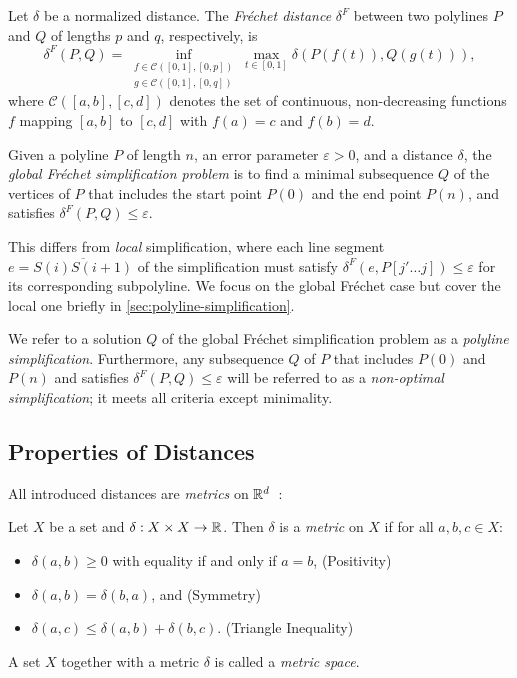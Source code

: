 \begin{definition}\label{def:frechet}
  Let \(\delta\) be a normalized distance. The \emph{Fréchet distance} \(\delta^F\) between two polylines \(P\) and \(Q\) of lengths \(p\) and \(q\), respectively, is
	\[\delta^F(P, Q) = \inf_{\substack{f \in \mathcal{C}([0,1], [0, p]) \\ g \in \mathcal{C}([0,1], [0, q])}} \max_{t \in [0,1]}\delta(P(f(t)), Q(g(t))),\]
	where \(\mathcal{C}([a,b], [c,d])\) denotes the set of continuous, non-decreasing functions \(f\) mapping \([a,b]\) to \([c,d]\) with \(f(a) = c\) and \(f(b) = d\).
\end{definition}

\begin{definition}
	Given a polyline \(P\) of length \(n\), an error parameter \(\varepsilon > 0\), and a distance \(\delta\), the \emph{global Fréchet simplification problem} is to find a minimal subsequence \(Q\) of the vertices of \(P\) that includes the start point \(P(0)\) and the end point \(P(n)\), and satisfies \(\delta^F(P, Q) \leq \varepsilon\).
\end{definition}

This differs from \emph{local} simplification, where each line segment \(e = \overline{S(i)S(i+1)}\) of the simplification must satisfy \(\delta^F(e, P[j' \dots j]) \leq \varepsilon\) for its corresponding subpolyline. We focus on the global Fréchet case but cover the local one briefly in \cref{sec:polyline-simplification}.

We refer to a solution \(Q\) of the global Fréchet simplification problem as a \emph{polyline simplification}. Furthermore, any subsequence \(Q\) of \(P\) that includes \(P(0)\) and \(P(n)\) and satisfies \(\delta^F(P, Q) \leq \varepsilon\) will be referred to as a \emph{non-optimal simplification}; it meets all criteria except minimality.

\subsection{Properties of Distances}
All introduced distances are \emph{metrics} on \(\mathbb{R}^d\)~\cite{metric_spaces}:

\begin{definition}\label{def:metric}
  Let \(X\) be a set and \(\delta:X\times X \to \mathbb{R}\). Then \(\delta\) is a \emph{metric} on \(X\) if for all \(a, b, c \in X\):
  \begin{itemize}
    \item \(\delta(a, b) \geq 0\) with equality if and only if \(a = b\), \hfill (Positivity)
    \item \(\delta(a, b) = \delta(b, a)\), and \hfill (Symmetry)
    \item \(\delta(a, c) \leq \delta(a, b) + \delta(b, c)\). \hfill (Triangle Inequality)
  \end{itemize}
  A set \(X\) together with a metric \(\delta\) is called a \emph{metric space}.
\end{definition}

